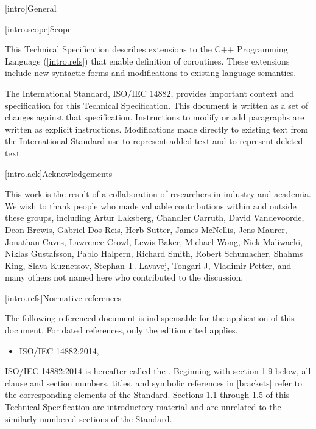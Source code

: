 
[intro]{General}

[intro.scope]{Scope}

\pnum
This Technical Specification describes extensions to the C++ 
Programming Language (\ref{intro.refs}) that
enable definition of coroutines. These extensions include 
new syntactic forms and modifications to existing language semantics.

\pnum
The International Standard, ISO/IEC 14882, provides important context
and specification for this Technical Specification. This document is 
written as a set of changes against that specification. Instructions
to modify or add paragraphs are written as explicit instructions. 
Modifications made directly to existing text from the International
Standard use  to represent added text and
 to represent deleted text.


[intro.ack]{Acknowledgements}

This work is the result of a collaboration of researchers in industry and academia. We wish to thank people who made valuable contributions within and outside these groups, including
Artur Laksberg,
Chandler Carruth,
David Vandevoorde,
Deon Brewis,
Gabriel Dos Reis,
Herb Sutter,
James McNellis,
Jens Maurer,
Jonathan Caves,
Lawrence Crowl,
Lewis Baker,
Michael Wong,
Nick Maliwacki,
Niklas Gustafsson,
Pablo Halpern,
Richard Smith,
Robert Schumacher,
Shahms King,
Slava Kuznetsov,
Stephan T. Lavavej,
Tongari J,
Vladimir Petter,
and many others not named here who contributed to
the discussion.

[intro.refs]{Normative references}

\pnum
The following referenced document is indispensable for the
application of this document. For dated references, only the
edition cited applies. 

\begin{itemize}
\item ISO/IEC 14882:2014, 
\end{itemize}

ISO/IEC 14882:2014 is hereafter called the .
%
Beginning with section 1.9 below, all clause and section numbers, titles,
and symbolic references in [brackets] refer to the corresponding elements of the \Cpp Standard. Sections 1.1 through 1.5 of this Technical
Specification are introductory material and are unrelated to the similarly-numbered sections of the \Cpp Standard.

